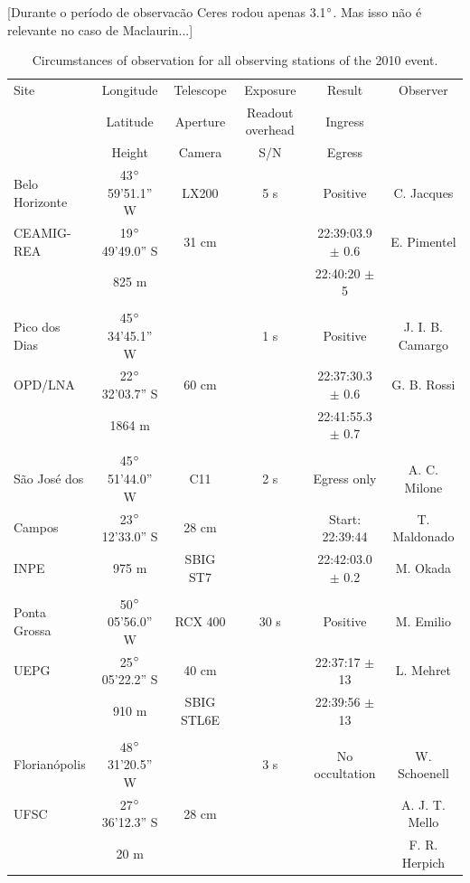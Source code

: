 \documentclass[useAMS,usenatbib]{mn2e}
\begin{document}
[Durante o per\'iodo de observac\~ao Ceres rodou apenas 3.1$\hbox{$^\circ$}$. Mas isso n\~ao \'e relevante no caso de Maclaurin...]

\begin{table}
 \centering
 \begin{minipage}{140mm}
  \caption{Circumstances of observation for all observing stations of the 2010 event. \label{Tab: obs-2010}}
  \begin{tabular}{@{}lccccc}
  \hline
     Site & Longitude & Telescope & Exposure & Result & Observer  \\
          & Latitude  & Aperture  & Readout overhead  & Ingress & \\          
          & Height    & Camera    &    S/N    & Egress    & \\          
\hline
 Belo Horizonte & 43$\hbox{$^\circ$}$59'51.1'' W & LX200 & 5 s & Positive & C. Jacques  \\
 CEAMIG-REA &19$\hbox{$^\circ$}$49'49.0'' S & 31 cm &     & 22:39:03.9 $\pm$ 0.6 &  E. Pimentel \\
            & 825 m                &       &     & 22:40:20 $\pm$ 5 &   \\
 & & & & & \\
 Pico dos Dias    & 45$\hbox{$^\circ$}$34'45.1'' W &       & 1 s & Positive & J. I. B. Camargo \\
 OPD/LNA    &22$\hbox{$^\circ$}$32'03.7'' S & 60 cm &     & 22:37:30.3 $\pm$ 0.6 &  G. B. Rossi \\
            & 1864 m               &       &     & 22:41:55.3 $\pm$ 0.7 &              \\
 & & & & & \\
 S\~ao Jos\'e dos       & 45$\hbox{$^\circ$}$51'44.0'' W &  C11  & 2 s & Egress only & A. C. Milone\\
 Campos       &23$\hbox{$^\circ$}$12'33.0'' S & 28 cm &     & Start: 22:39:44 & T. Maldonado\\
 INPE      & 975 m                & SBIG ST7 &     & 22:42:03.0 $\pm$ 0.2 & M. Okada    \\
 & & & & & \\
 Ponta Grossa       & 50$\hbox{$^\circ$}$05'56.0'' W & RCX 400 &30 s & Positive & M. Emilio   \\
 UEPG       &25$\hbox{$^\circ$}$05'22.2'' S & 40 cm &     & 22:37:17 $\pm$ 13 & L. Mehret   \\
            & 910 m                & SBIG STL6E &     & 22:39:56 $\pm$ 13 & \\
 & & & & & \\
 Florian\'opolis       & 48$\hbox{$^\circ$}$31'20.5'' W &       & 3 s & No occultation  & W. Schoenell\\
 UFSC       &27$\hbox{$^\circ$}$36'12.3'' S & 28 cm &     &  & A. J. T. Mello\\
            & 20 m                 &       &     &         & F. R. Herpich \\
\hline
\end{tabular}
\end{minipage}
\end{table}
\end{document}
